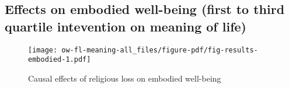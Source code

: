 \documentclass[
  singlecolumn]{report}
\begin{document}
\hypertarget{effects-on-embodied-well-being-first-to-third-quartile-intevention-on-meaning-of-life}{%
\subsection{Effects on embodied well-being (first to third quartile
intevention on meaning of
life)}\label{effects-on-embodied-well-being-first-to-third-quartile-intevention-on-meaning-of-life}}

\begin{figure}

{\centering \texttt{[image: ow-fl-meaning-all\_files/figure-pdf/fig-results-embodied-1.pdf]}

}

\caption{\label{fig-results-embodied}Causal effects of religious loss on
embodied well-being}

\end{figure}
\end{document}
